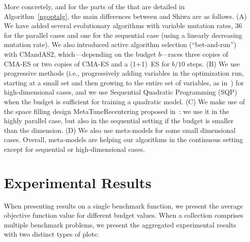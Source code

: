 {More concretely, and for the parts of the \ngoptq{} that are detailed in Algorithm~\ref{ngoptalg}, the main differences between \ngoptq{} and Shiwa are as follows. 
(A) We have added several evolutionary algorithms with variable mutation rates, 36 for the parallel cases and one for the sequential case (using a linearly decreasing mutation rate). We also introduced active algorithm selection (``bet-and-run'') with CMandAS2, which---depending on the budget $b$---races three copies of CMA-ES or two copies of CMA-ES and a (1+1)~ES for $b/10$ steps. 
 (B) We use progressive methods ({i.e., progressively adding variables in the optimization run, starting at a small set and then growing to the entire set of variables}, as in~\cite{berthierDE}) for high-dimensional cases, and we use {Sequential Quadratic Programming (SQP)~\cite{artelyssqp2}} when {the budget is sufficient for training a quadratic model}.
 (C) We make use of the space filling design MetaTuneRecentering proposed in~\cite{ppsnrescaling}: we use it in the highly parallel case, but also in the sequential setting if the budget is smaller than the dimension. %
 {(D) We also use  meta-models for some small dimensional cases. Overall, meta-models are helping our algorithms in the continuous setting except for sequential or  high-dimensional cases.}
 } 
 
 

 
\section{Experimental Results}\label{xpr}

When presenting results on a single benchmark function, we present the average objective function value for different budget values. 
When a collection comprises multiple benchmark problems, we present the aggregated experimental results with two distinct types of plots: 

